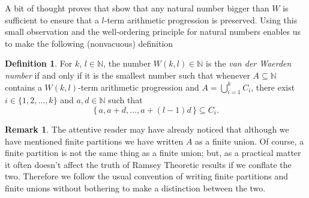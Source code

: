 \documentclass[12pt]{article}
\theoremstyle{plain}
\newtheorem*{roth}{Roth's Theorem}
\theoremstyle{definition}
\newtheorem*{defn}{Definition}
\newtheorem*{rmk}{Remark}
\newcommand{\bbN}{\mathbb{N}}
\begin{document}
A bit of thought proves that show that any
natural number bigger than $W$ is sufficient to ensure that a
$l$-term arithmetic progression is preserved.
Using this small observation and the well-ordering principle for
natural numbers enables us to make the following (nonvacuous) definition

  \begin{defn}
    For $k$, $l \in \bbN$, the number $W(k,l) \in \bbN$ is the
    \textsl{van der Waerden number} if and only if it is the smallest
    number such that whenever $A \subseteq \bbN$ contains a $W(k,l)$-term
    arithmetic progression and $A = \bigcup_{i=1}^k C_i$, there exist
    $i \in \{1, 2, \ldots, k\}$ and $a, d \in \bbN$ such that
      \[
        \{\, a, a+d, \ldots, a+(l-1)d \,\} \subseteq C_i.
      \]
  \end{defn}

  \begin{rmk}
    The attentive reader may have already noticed that
    although we have mentioned finite partitions we have written $A$
    as a finite union.
    Of course, a finite partition is not the same thing as a finite
    union; but, as a practical matter it often doesn't affect the
    truth of Ramsey Theoretic results if we conflate the two. 
    Therefore we follow the usual convention of writing finite
    partitions and finite unions without bothering to make a
    distinction between the two.
  \end{rmk}





\end{document}
